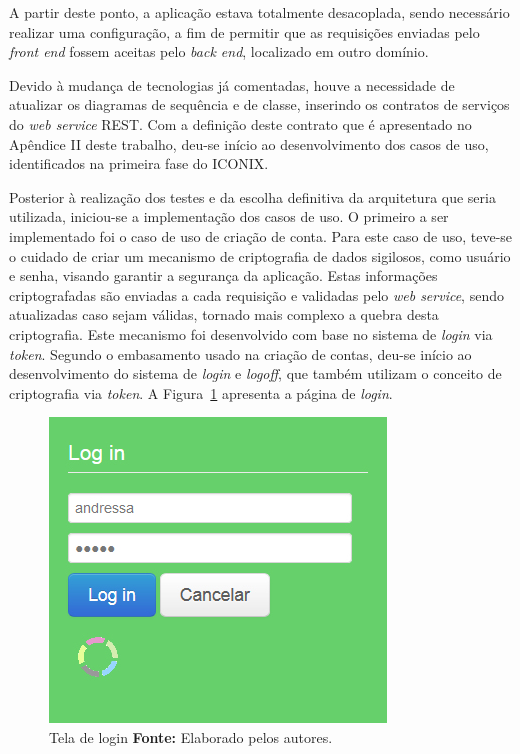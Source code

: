 \par A partir deste ponto, a aplicação estava totalmente desacoplada, sendo necessário realizar uma configuração, a fim de permitir que as requisições enviadas pelo \textit{front end} fossem aceitas pelo \textit{back end}, localizado em outro domínio.

\par Devido à mudança de tecnologias já comentadas, houve a necessidade de atualizar os diagramas de sequência e de classe, inserindo os contratos de serviços do \textit{web service} REST. Com a definição deste contrato que é apresentado no Apêndice II deste trabalho, deu-se início ao desenvolvimento dos casos de uso, identificados na primeira fase do ICONIX. 

\par Posterior à realização dos testes e da escolha definitiva da arquitetura que seria utilizada, iniciou-se a implementação dos casos de uso. O primeiro a ser implementado foi o caso de uso de criação de conta. Para este caso de uso, teve-se o cuidado de criar um mecanismo de criptografia de dados sigilosos, como usuário e senha, visando garantir a segurança da aplicação. Estas informações criptografadas são enviadas a cada requisição e validadas pelo \textit{web service}, sendo atualizadas caso sejam válidas, tornado mais complexo a quebra desta criptografia. Este mecanismo foi desenvolvido com base no sistema de \textit{login} via \textit{token}. Segundo o embasamento usado na criação de contas, deu-se início ao desenvolvimento do sistema de \textit{login} e \textit{logoff}, que também utilizam o conceito de criptografia via \textit{token}. A Figura~\ref{fig:pagina_login} apresenta a página de \textit{login}.

\begin{figure}[h!]
	\centerline{\includegraphics[scale=0.60]{./imagens/login.jpg}}
	\caption[Tela de login ]
	{Tela de login \textbf{Fonte:} Elaborado pelos autores.}
	\label{fig:pagina_login}
\end{figure}


